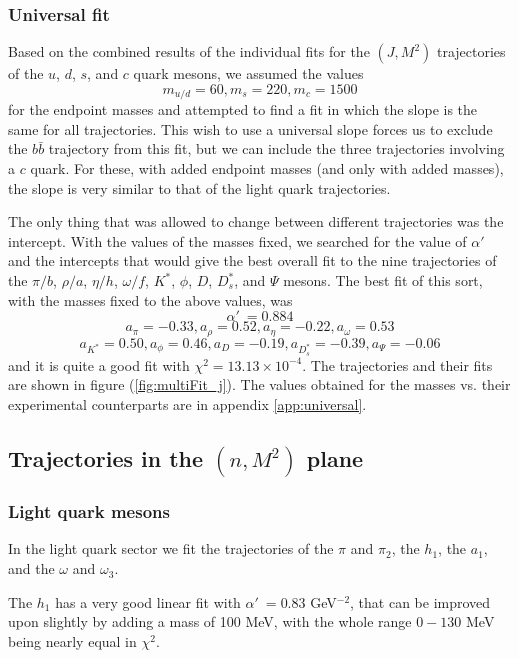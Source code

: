 \documentclass[11pt,a4]{article}
\def\be{\begin{equation}}
\def\ee{\end{equation}}
\newcommand{\alp}{\ensuremath{\alpha'\:}}
\newcommand{\bbb}{b\bar{b}}
\newcommand{\ten}[1]{\times10^{#1}}
\begin{document}
		\subsubsection{Universal fit} \label{sec:universal}
				
				Based on the combined results of the individual fits for the \((J,M^2)\) trajectories of the \(u\), \(d\), \(s\), and \(c\) quark mesons, we assumed the values
				\be m_{u/d} = 60, m_s = 220, m_c = 1500 \ee
				for the endpoint masses and attempted to find a fit in which the slope is the same for all trajectories. This wish to use a universal slope forces us to exclude the \(\bbb\) trajectory from this fit, but we can include the three trajectories involving a \(c\) quark. For these, with added endpoint masses (and only with added masses), the slope is very similar to that of the light quark trajectories.
								
				The only thing that was allowed to change between different trajectories was the intercept. With the values of the masses fixed, we searched for the value of \(\alp\) and the intercepts that would give the best overall fit to the nine trajectories of the \(\pi/b\), \(\rho/a\), \(\eta/h\), \(\omega/f\), \(K^*\), \(\phi\), \(D\), \(D^*_s\), and \(\Psi\) mesons. The best fit of this sort, with the masses fixed to the above values, was
				\be \alp = 0.884 \ee
				\[ a_\pi = -0.33, a_\rho = 0.52, a_\eta = -0.22, a_\omega = 0.53 \]
				\[ a_{K^*} = 0.50, a_\phi = 0.46, a_D = -0.19, a_{D^*_s} = -0.39, a_\Psi = -0.06\]
				and it is quite a good fit with \(\chi^2 = 13.13\ten{-4}\). The trajectories and their fits are shown in figure (\ref{fig:multiFit_j}). The values obtained for the masses vs. their experimental counterparts are in appendix \ref{app:universal}.
				
\subsection{Trajectories in the \texorpdfstring{$(n,M^2)$}{(n,M2)} plane}
	\subsubsection{Light quark mesons}
		In the light quark sector we fit the trajectories of the \(\pi\) and \(\pi_2\), the \(h_1\), the \(a_1\), and the \(\omega\) and \(\omega_3\).
		
		The \(h_1\) has a very good linear fit with \(\alp = 0.83\) GeV\(^{-2}\), that can be improved upon slightly by adding a mass of 100 MeV, with the whole range \(0-130\) MeV being nearly equal in \(\chi^2\).
		
\end{document}
